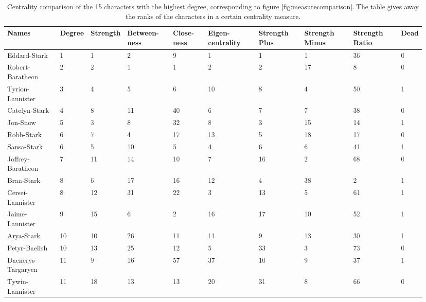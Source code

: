\begin{table}
\caption{Centrality comparison of the 15 characters with the highest degree, corresponding to figure \ref{fig:measurecomparison}. The table gives away the ranks of the characters in a certain centrality measure.}
    \label{table:comparison}
    \begin{adjustbox}{angle=270}
    \begin{tabular}
    {p{2.5cm}p{0.9cm}p{1.2cm}p{1.2cm}p{0.9cm}p{1.2cm}p{1.2cm}p{1.2cm}p{1.2cm}p{0.9cm}}
    \toprule
    Names & Degree & Strength & Between-ness & Close-ness & Eigen-centrality & Strength Plus & Strength Minus & Strength Ratio & Dead\\
    \midrule
    Eddard-Stark & 1 & 1 & 2 & 9 & 1 & 1 & 1 & 36 & 0\\
    Robert-Baratheon & 2 & 2 & 1 & 1 & 2 & 2 & 17 & 8 & 0\\
    Tyrion-Lannister & 3 & 4 & 5 & 6 & 10 & 8 & 4 & 50 & 1\\
    Catelyn-Stark & 4 & 8 & 11 & 40 & 6 & 7 & 7 & 38 & 0\\
    Jon-Snow & 5 & 3 & 8 & 32 & 8 & 3 & 15 & 14 & 1\\
    \addlinespace
    Robb-Stark & 6 & 7 & 4 & 17 & 13 & 5 & 18 & 17 & 0\\
    Sansa-Stark & 6 & 5 & 10 & 5 & 4 & 6 & 6 & 41 & 1\\
    Joffrey-Baratheon & 7 & 11 & 14 & 10 & 7 & 16 & 2 & 68 & 0\\
    Bran-Stark & 8 & 6 & 17 & 16 & 12 & 4 & 38 & 2 & 1\\
    Cersei-Lannister & 8 & 12 & 31 & 22 & 3 & 13 & 5 & 61 & 1\\
    \addlinespace
    Jaime-Lannister & 9 & 15 & 6 & 2 & 16 & 17 & 10 & 52 & 1\\
    Arya-Stark & 10 & 10 & 26 & 11 & 11 & 9 & 13 & 30 & 1\\
    Petyr-Baelish & 10 & 13 & 25 & 12 & 5 & 33 & 3 & 73 & 0\\
    Daenerys-Targaryen & 11 & 9 & 16 & 57 & 37 & 10 & 9 & 37 & 1\\
    Tywin-Lannister & 11 & 18 & 13 & 13 & 20 & 31 & 8 & 66 & 0\\
    \bottomrule
    \end{tabular}
    \end{adjustbox}
\end{table}

